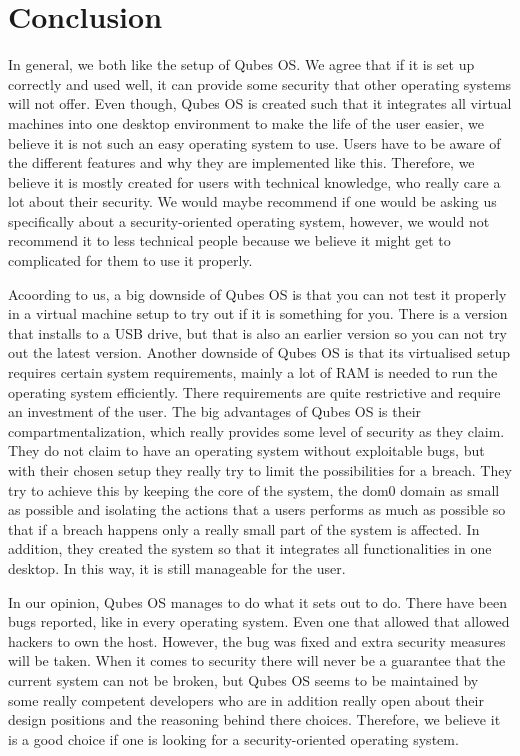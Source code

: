 \documentclass[runningheads,a4paper]{article}
\begin{document}
\section{Conclusion}
In general, we both like the setup of Qubes OS. We agree that if it is set up correctly and used well, it can provide some security that other operating systems will not offer. Even though, Qubes OS is created such that it integrates all virtual machines into one desktop environment to make the life of the user easier, we believe it is not such an easy operating system to use. Users have to be aware of the different features and why they are implemented like this. Therefore, we believe it is mostly created for users with technical knowledge, who really care a lot about their security. We would maybe recommend if one would be asking us specifically about a security-oriented operating system, however, we would not recommend it to less technical people because we believe it might get to complicated for them to use it properly.

Acoording to us, a big downside of Qubes OS is that you can not test it properly in a virtual machine setup to try out if it is something for you. There is a version that installs to a USB drive, but that is also an earlier version so you can not try out the latest version. Another downside of Qubes OS is that its virtualised setup requires certain system requirements, mainly a lot of RAM is needed to run the operating system efficiently. There requirements are quite restrictive and require an investment of the user.
The big advantages of Qubes OS is their compartmentalization, which really provides some level of security as they claim. They do not claim to have an operating system without exploitable bugs, but with their chosen setup they really try to limit the possibilities for a breach. They try to achieve this by keeping the core of the system, the dom0 domain as small as possible and isolating the actions that a users performs as much as possible so that if a breach happens only a really small part of the system is affected. In addition, they created the system so that it integrates all functionalities in one desktop. In this way, it is still manageable for the user.

In our opinion, Qubes OS manages to do what it sets out to do. There have been bugs reported, like in every operating system. Even one that allowed that allowed hackers to own the host. However, the bug was fixed and extra security measures will be taken. When it comes to security there will never be a guarantee that the current system can not be broken, but Qubes OS seems to be maintained by some really competent developers who are in addition really open about their design positions and the reasoning behind there choices. Therefore, we believe it is a good choice if one is looking for a security-oriented operating system.
\nocite{*}





\end{document}
